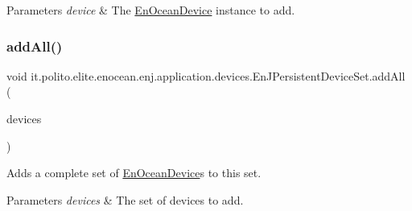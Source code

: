 \begin{DoxyParams}{Parameters}
{\em device} & The \hyperlink{}{En\+Ocean\+Device} instance to add. \\
\hline
\end{DoxyParams}
\hypertarget{classit_1_1polito_1_1elite_1_1enocean_1_1enj_1_1application_1_1devices_1_1_en_j_persistent_device_set_a09fb55c9d8f446e1847b8740d3193db8}{}\label{classit_1_1polito_1_1elite_1_1enocean_1_1enj_1_1application_1_1devices_1_1_en_j_persistent_device_set_a09fb55c9d8f446e1847b8740d3193db8} 
\subsubsection{\texorpdfstring{add\+All()}{addAll()}}
{\footnotesize\ttfamily void it.\+polito.\+elite.\+enocean.\+enj.\+application.\+devices.\+En\+J\+Persistent\+Device\+Set.\+add\+All (\begin{DoxyParamCaption}\item[{Collection$<$? extends \hyperlink{classit_1_1polito_1_1elite_1_1enocean_1_1enj_1_1model_1_1_en_ocean_device}{En\+Ocean\+Device} $>$}]{devices }\end{DoxyParamCaption})}

Adds a complete set of \hyperlink{}{En\+Ocean\+Device}s to this set.


\begin{DoxyParams}{Parameters}
{\em devices} & The set of devices to add. \\
\hline
\end{DoxyParams}
\hypertarget{classit_1_1polito_1_1elite_1_1enocean_1_1enj_1_1application_1_1devices_1_1_en_j_persistent_device_set_a90909e32675ce6eb52fa631fbb477ef3}{}\label{classit_1_1polito_1_1elite_1_1enocean_1_1enj_1_1application_1_1devices_1_1_en_j_persistent_device_set_a90909e32675ce6eb52fa631fbb477ef3} 
